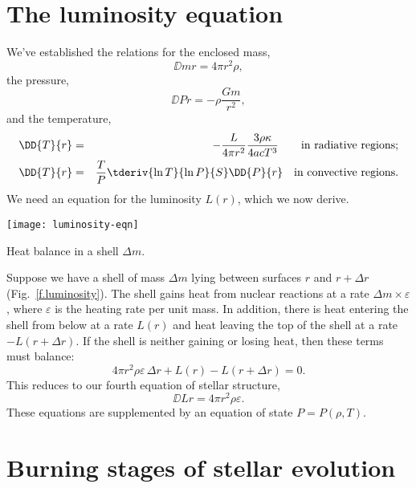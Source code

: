 
\section{The luminosity equation}

We've established the relations for the enclosed mass,
\begin{equation}\label{e.mass}
\DD{m}{r} = 4\pi r^{2}\rho,
\end{equation}
the pressure,
\begin{equation}\label{e.pressure}
\DD{P}{r} = -\rho\frac{Gm}{r^{2}},
\end{equation}
and the temperature,
\begin{eqnarray}\label{e.temperature-radiative}
\DD{T}{r} &=& - \frac{L}{4\pi r^{2}}\frac{3\rho\kappa}{4ac T^{3}}\qquad \textrm{in radiative regions;} \\ 
\label{e.temperature-convective}
\DD{T}{r} &=& \frac{T}{P}\tderiv{\ln T}{\ln P}{S}\DD{P}{r} \quad \textrm{in convective regions}.
\end{eqnarray}
We need an equation for the luminosity $L(r)$, which we now derive.

\begin{marginfigure}
\texttt{[image: luminosity-eqn]}
\caption[Heat balance in a mass shell]{Heat balance in a shell $\Delta m$.}
\label{f.luminosity}
\end{marginfigure}
Suppose we have a shell of mass $\Delta m$ lying between surfaces $r$ and $r+\Delta r$ (Fig.~\ref{f.luminosity}). The shell gains heat from nuclear reactions at a rate $\Delta m \times \varepsilon$, where $\varepsilon$ is the heating rate per unit mass.  In addition, there is heat entering the shell from below at a rate $L(r)$ and heat leaving the top of the shell at a rate $-L(r+\Delta r)$.
If the shell is neither gaining or losing heat, then these terms must balance:
\[ 4\pi r^{2}\rho\varepsilon\,\Delta r + L(r) - L(r+\Delta r) = 0. \]
This reduces to our fourth equation of stellar structure,
\begin{equation}
\label{e.luminosity}
\DD{L}{r} = 4\pi r^{2}\rho\varepsilon.
\end{equation}
These equations are supplemented by an equation of state $P = P(\rho,T)$.

\section{Burning stages of stellar evolution}

